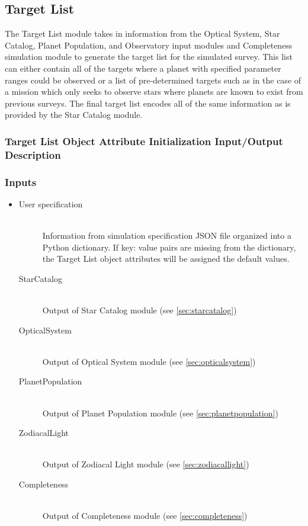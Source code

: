 \documentclass[cleanfoot]{asme2ej}
\begin{document}

\subsection{Target List}
The Target List module takes in information from the Optical System, Star Catalog, Planet Population, and Observatory input modules and Completeness simulation module to generate the target list for the simulated survey.  This list can either contain all of the targets where a planet with specified parameter ranges could be observed or a list of pre-determined targets such as in the case of a mission which only seeks to observe stars where planets are known to exist from previous surveys.  The final target list encodes all of the same information as is provided by the Star Catalog module.

\label{sec:targetlist}
\subsubsection{Target List Object Attribute Initialization Input/Output Description}
\subsubsection*{Inputs}
\begin{itemize}
    \item 
    \begin{description}
        \item[User specification] \hfill \\
        Information from simulation specification JSON file organized into a Python dictionary. If key: value pairs are missing from the dictionary, the Target List object attributes will be assigned the default values.
        \item[StarCatalog] \hfill \\
        Output of Star Catalog module (see \ref{sec:starcatalog})
        \item[OpticalSystem] \hfill \\
        Output of Optical System module (see \ref{sec:opticalsystem})
        \item[PlanetPopulation] \hfill \\
        Output of Planet Population module (see \ref{sec:planetpopulation})
        \item[ZodiacalLight] \hfill \\
        Output of Zodiacal Light module (see \ref{sec:zodiacallight})
        \item[Completeness] \hfill \\
        Output of Completeness module (see \ref{sec:completeness})
    \end{description}
\end{itemize}
\end{document}
